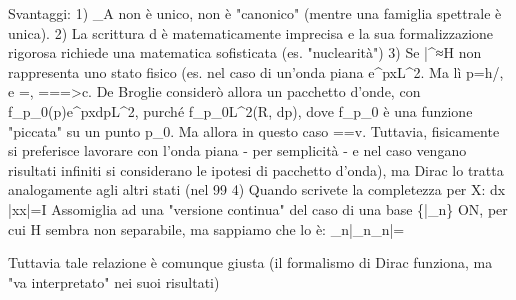 \documentclass[12pt]{article}
\begin{document}
Svantaggi:
	1) \phi_A non è unico, non è "canonico" (mentre una famiglia spettrale è unica). 
	2) La scrittura \int d\lambda \ket{\lambda}\bra{\lambda} è matematicamente imprecisa e la sua formalizzazione rigorosa richiede una matematica sofisticata (es. "nuclearità")
	3) Se \left\langle\lambda\right|\notin {}^\prime≈H non rappresenta uno stato fisico (es. nel caso di un'onda piana e^{px}\notin L^2. Ma lì p=h/\lambda, e \nu =, \lambda\nu ===>c. De Broglie considerò allora un pacchetto d'onde, con \int f_{p_0}\left(p\right)e^{px}dp\in L^2, purché f_{p_0}\in L^2(R, dp), dove f_{p_0} è una funzione "piccata" su un punto p_0. Ma allora in questo caso ==v. Tuttavia, fisicamente si preferisce lavorare con l'onda piana - per semplicità - e nel caso vengano risultati infiniti si considerano le ipotesi di pacchetto d'onda), ma Dirac lo tratta analogamente agli altri stati (nel 99%
	4) Quando scrivete la completezza per X:
	\int dx \left|x\right\rangle\left\langle x\right|=I
	Assomiglia ad una "versione continua" del caso di una base \left\{|\lambda_n\ket\right\} ON, per cui H sembra non separabile, ma sappiamo che lo è:
	\sum_{n}{\left|\lambda_n\right\rangle\left\langle\lambda_n\right|=}
	
	Tuttavia tale relazione è comunque giusta (il formalismo di Dirac funziona, ma "va interpretato" nei suoi risultati)
\end{document}
